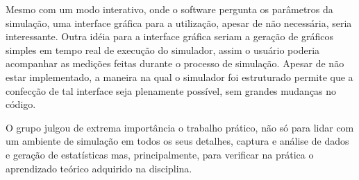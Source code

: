 \documentclass[a4paper,10pt]{article}
\begin{document}
    Mesmo com um modo interativo, onde o software pergunta os parâmetros da simulação, uma interface gráfica para a utilização, apesar de não necessária, seria interessante. Outra idéia para a interface gráfica seriam a geração de gráficos simples em tempo real de execução do simulador, assim o usuário poderia acompanhar as medições feitas durante o processo de simulação. Apesar de não estar implementado, a maneira na qual o simulador foi estruturado permite que a confecção de tal interface seja plenamente possível, sem grandes mudanças no código.

    O grupo julgou de extrema importância o trabalho prático, não só para lidar com um ambiente de simulação em todos os seus detalhes, captura e análise de dados e geração de estatísticas mas, principalmente, para verificar na prática o aprendizado teórico adquirido na disciplina.
\pagebreak
\end{document}
